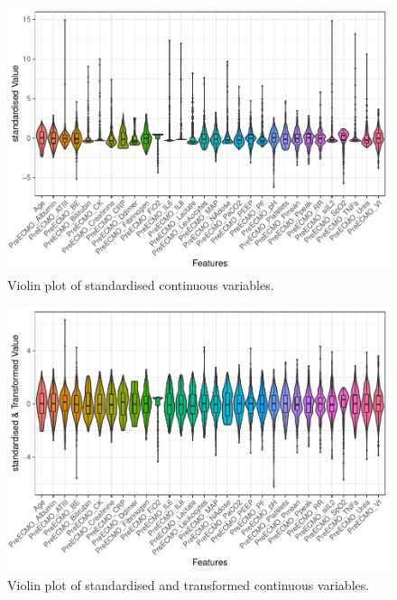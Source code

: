 \documentclass[12pt,]{article}
\newcommand{\appendixA}{ \setcounter{table}{0} \renewcommand{\thetable}{A\arabic{table}} \setcounter{figure}{0} \renewcommand{\thefigure}{A\arabic{figure}} }
\begin{document}
\appendixA

\begin{figure}[H]

{\centering \includegraphics[width=0.75\linewidth]{figure/graphics-unnamed-chunk-8-1} 

}

\caption{\label{fig:violin-standardised}Violin plot of standardised continuous variables.}\label{fig:unnamed-chunk-8}
\end{figure}

\begin{figure}[H]

{\centering \includegraphics[width=0.75\linewidth]{figure/graphics-unnamed-chunk-9-1} 

}

\caption{\label{fig:violin-transformed}Violin plot of standardised and transformed continuous variables.}\label{fig:unnamed-chunk-9}
\end{figure}
\end{document}
